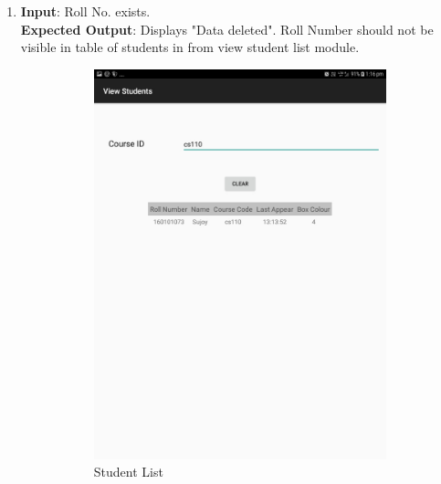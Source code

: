 \documentclass{scrreprt}
\begin{document}
\begin{itemize}
\begin{enumerate}
\item \textbf{Input}: Roll No. exists.\\
\textbf{Expected Output}: Displays "Data deleted". Roll Number should not be visible in table of students in from view student list module. 
\begin{figure}[H]
\begin{subfigure}{0.5\textwidth}
\includegraphics[width=0.85\linewidth, keepaspectratio]{deleteshow.jpg} 
\caption{Student List}
\label{fig:subim1}
\end{subfigure}
\begin{subfigure}{0.5\textwidth}

\end{subfigure}
\end{figure}
\end{enumerate}
\end{itemize}
\end{document}
